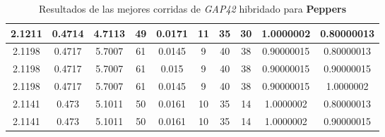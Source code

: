 \begin{table}[h!]
\begin{center}
\begin{tabular}{|c|c|c|c|c|c|c|c|c|c|}
        \hline
        \hline
            2.1211 & 0.4714  & 4.7113 & 49 & 0.0171 & 11 & 35 & 30 & 1.0000002 & 0.80000013\\
        \hline
        \hline
            2.1198 & 0.4717  & 5.7007 & 61 & 0.0145 & 9 & 40 & 38 & 0.90000015 & 0.80000013\\
        \hline
        \hline
            2.1198 & 0.4717  & 5.7007 & 61 & 0.015 & 9 & 40 & 38 & 0.90000015 & 0.90000015\\
        \hline
        \hline
            2.1198 & 0.4717  & 5.7007 & 61 & 0.0145 & 9 & 40 & 38 & 0.90000015 & 1.0000002\\
        \hline
        \hline
            2.1141 & 0.473  & 5.1011 & 50 & 0.0161 & 10 & 35 & 14 & 1.0000002 & 0.80000013\\
        \hline
        \hline
            2.1141 & 0.473  & 5.1011 & 50 & 0.0161 & 10 & 35 & 14 & 1.0000002 & 0.90000015\\
        \hline
        \end{tabular}
        \caption{Resultados de las mejores corridas de \emph{GAP42} hibridado para {\bf Peppers}}
        \label{tb:tableGAP42}
    \end{center}
\end{table}
